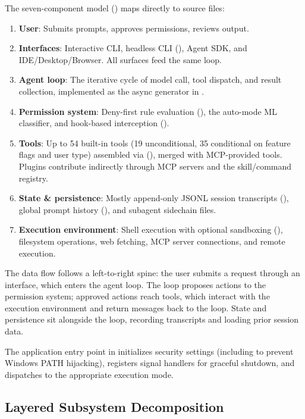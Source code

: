 The seven-component model () maps directly to source files:

\begin{enumerate}[nosep]
  \item \textbf{User}: Submits prompts, approves permissions, reviews output.
  \item \textbf{Interfaces}: Interactive CLI, headless CLI (), Agent SDK, and IDE/Desktop/Browser. All surfaces feed the same loop.
  \item \textbf{Agent loop}: The iterative cycle of model call, tool dispatch, and result collection, implemented as the  async generator in .
  \item \textbf{Permission system}: Deny-first rule evaluation (), the auto-mode ML classifier, and hook-based interception ().
  \item \textbf{Tools}: Up to 54 built-in tools (19 unconditional, 35 conditional on feature flags and user type) assembled via  (), merged with MCP-provided tools. Plugins contribute indirectly through MCP servers and the skill/command registry.
  \item \textbf{State \& persistence}: Mostly append-only JSONL session transcripts (), global prompt history (), and subagent sidechain files.
  \item \textbf{Execution environment}: Shell execution with optional sandboxing (), filesystem operations, web fetching, MCP server connections, and remote execution.
\end{enumerate}

The data flow follows a left-to-right spine: the user submits a request through an interface, which enters the agent loop. The loop proposes actions to the permission system; approved actions reach tools, which interact with the execution environment and return  messages back to the loop. State and persistence sit alongside the loop, recording transcripts and loading prior session data.

The application entry point  in  initializes security settings (including  to prevent Windows PATH hijacking), registers signal handlers for graceful shutdown, and dispatches to the appropriate execution mode.

\subsection{Layered Subsystem Decomposition}
\label{sec:arch:layers}

